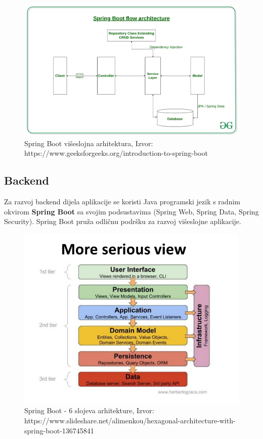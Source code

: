 	\begin{figure}[H]
		\centering
		\includegraphics[width=\linewidth]{slike/spring-boot-layers.jpg}
		\caption {Spring Boot višeslojna arhitektura, Izvor: https://www.geeksforgeeks.org/introduction-to-spring-boot
		}
		\label{fig:spring-layers}
	\end{figure}

\newpage
	\subsection{Backend}
		Za razvoj backend dijela aplikacije se koristi Java programski jezik s radnim okvirom \textbf{Spring Boot} sa svojim podsustavima (Spring Web, Spring Data, Spring Security). Spring Boot pruža odličnu podršku za razvoj višeslojne aplikacije.
		
		\begin{figure}[H]
			\centering
			\includegraphics[width=\linewidth]{slike/spring-6-layers.jpg}
			\caption {Spring Boot - 6 slojeva arhitekture, Izvor: https://www.slideshare.net/alimenkou/hexagonal-architecture-with-spring-boot-136745841
			}
			\label{fig:spring-6-layers}
		\end{figure}
		
